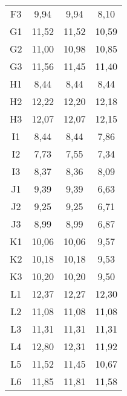 \begin{center}
\begin{longtable}{cccc}
    F3    & 9,94  & 9,94  & 8,10 \\
    G1    & 11,52 & 11,52 & 10,59 \\
    G2    & 11,00 & 10,98 & 10,85 \\
    G3    & 11,56 & 11,45 & 11,40 \\
    H1    & 8,44  & 8,44  & 8,44 \\
    H2    & 12,22 & 12,20 & 12,18 \\
    H3    & 12,07 & 12,07 & 12,15 \\
    I1    & 8,44  & 8,44  & 7,86 \\
    I2    & 7,73  & 7,55  & 7,34 \\
    I3    & 8,37  & 8,36  & 8,09 \\
    J1    & 9,39  & 9,39  & 6,63 \\
    J2    & 9,25  & 9,25  & 6,71 \\
    J3    & 8,99  & 8,99  & 6,87 \\
    K1    & 10,06 & 10,06 & 9,57 \\
    K2    & 10,18 & 10,18 & 9,53 \\
    K3    & 10,20 & 10,20 & 9,50 \\
    L1    & 12,37 & 12,27 & 12,30 \\
    L2    & 11,08 & 11,08 & 11,08 \\
    L3    & 11,31 & 11,31 & 11,31 \\
    L4    & 12,80 & 12,31 & 11,92 \\
    L5    & 11,52 & 11,45 & 10,67 \\
    L6    & 11,85 & 11,81 & 11,58 \\

\end{longtable}
\end{center}

